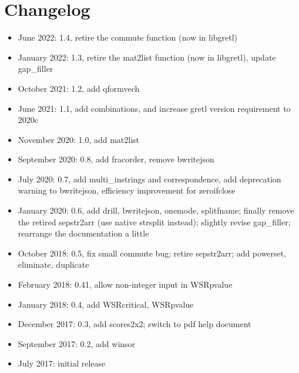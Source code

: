 \documentclass[11pt,english]{article}
\begin{document}
\section{Changelog }
\begin{itemize}
\item June 2022: 1.4, retire the commute function (now in libgretl)
\item January 2022: 1.3, retire the mat2list function (now in
  libgretl), update gap\_filler
\item October 2021: 1.2, add qformvech  
\item June 2021: 1.1, add combinations, and increase gretl version requirement to 2020c
\item November 2020: 1.0, add mat2list
\item September 2020: 0.8, add fracorder, remove bwritejson
\item July 2020: 0.7, add multi\_instrings and correspondence, add deprecation warning to
bwritejson, efficiency improvement for zeroifclose
\item January 2020: 0.6, add drill, bwritejson, onemode, splitfname;
  finally remove the retired sepstr2arr (use native strsplit instead);
  slightly revise gap\_filler; rearrange the documentation a little
\item October 2018: 0.5, fix small commute bug; retire sepstr2arr; add powerset,
  eliminate, duplicate
\item February 2018: 0.41, allow non-integer input in WSRpvalue
\item January 2018: 0.4, add WSRcritical, WSRpvalue
\item December 2017: 0.3, add scores2x2; switch to pdf help document
\item September 2017: 0.2, add winsor
\item July 2017: initial release
\end{itemize}
\end{document}
